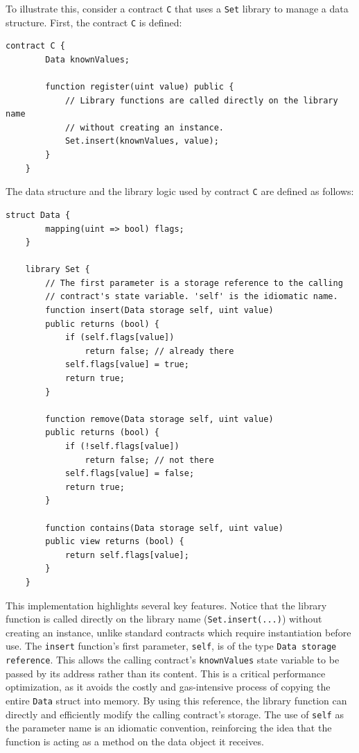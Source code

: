 \documentclass{scrbook}
\begin{document}
To illustrate this, consider a contract \texttt{C} that uses a \texttt{Set} library to manage a data structure. First, the contract \texttt{C} is defined:

\begin{lstlisting}[caption={Contract that uses a 'Set' library}, label={lst:library_user}]
    contract C {
        Data knownValues;
    
        function register(uint value) public {
            // Library functions are called directly on the library name
            // without creating an instance.
            Set.insert(knownValues, value);
        }
    }
\end{lstlisting}

The data structure and the library logic used by contract \texttt{C} are defined as follows:

\begin{lstlisting}[caption={Data structure and library logic used by contract C}, label={lst:library_code}]
    struct Data {
        mapping(uint => bool) flags;
    }
    
    library Set {
        // The first parameter is a storage reference to the calling
        // contract's state variable. 'self' is the idiomatic name.
        function insert(Data storage self, uint value)
        public returns (bool) {
            if (self.flags[value])
                return false; // already there
            self.flags[value] = true;
            return true;
        }
    
        function remove(Data storage self, uint value)
        public returns (bool) {
            if (!self.flags[value])
                return false; // not there
            self.flags[value] = false;
            return true;
        }
    
        function contains(Data storage self, uint value)
        public view returns (bool) {
            return self.flags[value];
        }
    }
\end{lstlisting}

This implementation highlights several key features. Notice that the library function is called directly on the library name (\texttt{Set.insert(...)}) without creating an instance, unlike standard contracts which require instantiation before use. The \texttt{insert} function's first parameter, \texttt{self}, is of the type \texttt{Data storage reference}. This allows the calling contract's \texttt{knownValues} state variable to be passed by its address rather than its content. This is a critical performance optimization, as it avoids the costly and gas-intensive process of copying the entire \texttt{Data} struct into memory. By using this reference, the library function can directly and efficiently modify the calling contract's storage. The use of \texttt{self} as the parameter name is an idiomatic convention, reinforcing the idea that the function is acting as a method on the data object it receives.\\
\end{document}

